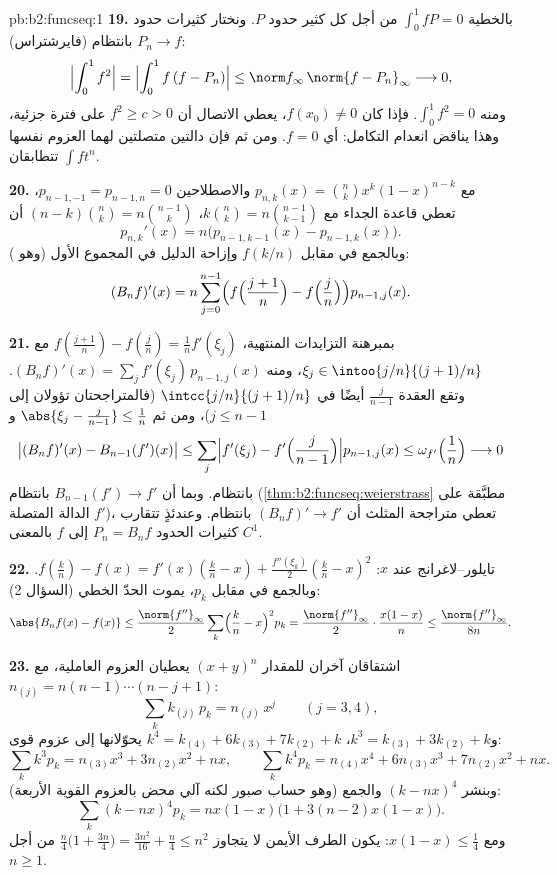 \begin{solution}{pb:b2:funcseq:1}
\textbf{19.} بالخطية $\int_0^1 fP = 0$ من أجل كل
كثير حدود $P$. ونختار كثيرات حدود $P_n \to f$ بانتظام
(فايرشتراس):
\[
\Bigl|\int_0^1 f^2\Bigr|
= \Bigl|\int_0^1 f\,(f - P_n)\Bigr|
\leq \norm f_\infty\,\norm{f - P_n}_\infty
\longrightarrow 0 ,
\]
ومنه $\int_0^1 f^2 = 0$. فإذا كان $f(x_0) \neq 0$، يعطي الاتصال أن
$f^2 \geq c > 0$ على فترة جزئية، وهذا يناقض انعدام
التكامل: أي $f = 0$. ومن ثم فإن دالتين متصلتين لهما
العزوم نفسها $\int f t^n$ تتطابقان.

\textbf{20.} مع $p_{n,k}(x) = \binom nk x^k(1-x)^{n-k}$ والاصطلاحين
$p_{n-1,-1} = p_{n-1,n} = 0$، تعطي قاعدة الجداء
مع $k\binom nk = n\binom{n-1}{k-1}$، $(n-k)\binom nk =
n\binom{n-1}{k}$ أن
\[
p_{n,k}'(x) = n\bigl(p_{n-1,k-1}(x) - p_{n-1,k}(x)\bigr) .
\]
وبالجمع في مقابل $f(k/n)$ وإزاحة الدليل في المجموع
الأول (وهو ):
\[
(B_nf)'(x) = n\sum_{j=0}^{n-1}\Bigl(f\Bigl(\frac{j+1}n\Bigr)
- f\Bigl(\frac jn\Bigr)\Bigr)p_{n-1,j}(x) .
\]

\textbf{21.} بمبرهنة التزايدات المنتهية، $f(\frac{j+1}n) -
f(\frac jn) = \frac1n f'(\xi_j)$ مع $\xi_j \in
\intoo{j/n}{(j+1)/n}$، ومنه $(B_nf)'(x) = \sum_j
f'(\xi_j)\,p_{n-1,j}(x)$. وتقع العقدة $\frac{j}{n-1}$ أيضًا في
$\intcc{j/n}{(j+1)/n}$ (فالمتراجحتان تؤولان إلى $j \leq
n-1$)، ومن ثم $\abs{\xi_j - \frac j{n-1}} \leq \frac1n$ و
\[
\bigl|(B_nf)'(x) - B_{n-1}(f')(x)\bigr|
\leq \sum_j\Bigl|f'(\xi_j) -
f'\Bigl(\frac{j}{n-1}\Bigr)\Bigr| p_{n-1,j}(x)
\leq \omega_{f'}\Bigl(\frac1n\Bigr) \longrightarrow 0
\]
بانتظام. وبما أن $B_{n-1}(f') \to f'$ بانتظام
(\cref{thm:b2:funcseq:weierstrass} مطبَّقة على الدالة المتصلة
$f'$)، تعطي متراجحة المثلث أن $(B_nf)' \to f'$
بانتظام. وعندئذٍ تتقارب كثيرات الحدود $P_n = B_nf$ إلى $f$
بالمعنى $C^1$.

\textbf{22.} تايلور--لاغرانج عند $x$: $f(\frac kn) - f(x) =
f'(x)(\frac kn - x) + \frac{f''(\xi_k)}2(\frac kn - x)^2$.
وبالجمع في مقابل $p_k$، يموت الحدّ الخطي (السؤال 2):
\[
\abs{B_nf(x) - f(x)}
\leq \frac{\norm{f''}_\infty}{2}\sum_k\Bigl(\frac kn -
x\Bigr)^2p_k
= \frac{\norm{f''}_\infty}{2}\cdot\frac{x(1-x)}{n}
\leq \frac{\norm{f''}_\infty}{8n} .
\]

\textbf{23.} اشتقاقان آخران للمقدار $(x+y)^n$ يعطيان
العزوم العاملية، مع $n_{(j)} = n(n-1)\cdots(n-j+1)$:
\[
\sum_k k_{(j)}\,p_k = n_{(j)}\,x^j \qquad (j = 3, 4),
\]
و$k^3 = k_{(3)} + 3k_{(2)} + k$، $k^4 = k_{(4)} + 6k_{(3)} +
7k_{(2)} + k$ يحوّلانها إلى عزوم قوى:
\[
\sum_k k^3p_k = n_{(3)}x^3 + 3n_{(2)}x^2 + nx,
\qquad
\sum_k k^4p_k = n_{(4)}x^4 + 6n_{(3)}x^3 + 7n_{(2)}x^2 + nx .
\]
وبنشر $(k - nx)^4$ والجمع (وهو حساب صبور لكنه آلي محض
بالعزوم القوية الأربعة):
\[
\sum_k(k-nx)^4p_k = nx(1-x)\bigl(1 + 3(n-2)x(1-x)\bigr) .
\]
ومع $x(1-x) \leq \frac14$: يكون الطرف الأيمن لا يتجاوز
$\frac n4\bigl(1 + \frac{3n}4\bigr) = \frac{3n^2}{16} +
\frac n4 \leq n^2$ من أجل $n \geq 1$.


\end{solution}
